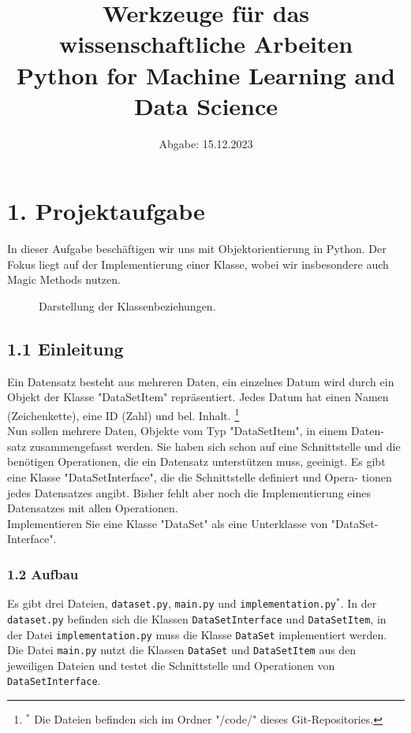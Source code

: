 \documentclass{article}
\begin{document}
\title{\textbf{\Large Werkzeuge für das wissenschaftliche Arbeiten}\\
 \normalsize Python for Machine Learning and Data Science}
\date{Abgabe: 15.12.2023}
\maketitle

\renewcommand{\contentsname}{Inhaltsverzeichnis} 
\tableofcontents 

\vspace{1em}

\section*{1. Projektaufgabe}
In dieser Aufgabe beschäftigen wir uns mit Objektorientierung in Python. Der Fokus liegt auf der Implementierung einer Klasse, wobei wir insbesondere auch Magic Methods nutzen.\\

\renewcommand{\figurename}{Abbildung}
\begin{figure}[htbp]
  \centering
  
  \caption{Darstellung der Klassenbeziehungen.\normalsize}
\end{figure}

\subsection*{1.1 Einleitung}
Ein Datensatz besteht aus mehreren Daten, ein einzelnes Datum wird durch ein Objekt der Klasse "DataSetItem" repräsentiert. Jedes Datum hat einen Namen (Zeichenkette), eine ID (Zahl) und bel. Inhalt. \footnote{$^{*}$ Die Dateien befinden sich im Ordner "/code/" dieses Git-Repositories.}\\
Nun sollen mehrere Daten, Objekte vom Typ "DataSetItem", in einem Daten- satz zusammengefasst werden. Sie haben sich schon auf eine Schnittstelle und die benötigen Operationen, die ein Datensatz unterstützen muss, geeinigt. Es gibt eine Klasse "DataSetInterface", die die Schnittstelle definiert und Opera- tionen jedes Datensatzes angibt. Bisher fehlt aber noch die Implementierung eines Datensatzes mit allen Operationen. 
\\
Implementieren Sie eine Klasse "DataSet" als eine Unterklasse von "DataSet- Interface".

\subsubsection*{1.2 Aufbau}
Es gibt drei Dateien, \texttt{dataset.py}, \texttt{main.py} und \texttt{implementation.py}$^{*}$. In der \texttt{dataset.py} befinden sich die Klassen \texttt{DataSetInterface} und \texttt{DataSetItem}, in der Datei \texttt{implementation.py} muss die Klasse \texttt{DataSet} implementiert werden. Die Datei \texttt{main.py} nutzt die Klassen \texttt{DataSet} und \texttt{DataSetItem} aus den jeweiligen Dateien und testet die Schnittstelle und Operationen von \texttt{DataSetInterface}.\\
\end{document}
